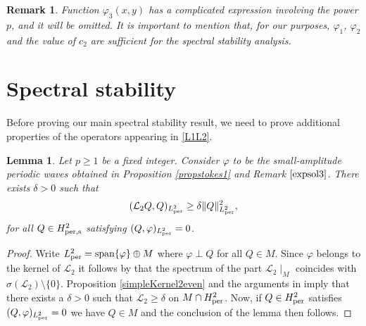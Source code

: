 \documentclass[12pt,reqno,a4paper]{amsart} %
\newcommand{\Ldois}{{\mathcal{L}_2}}
\numberwithin{equation}{section}
\numberwithin{figure}{section}
\newtheorem{remark}[theorem]{Remark}
\newtheorem{lemma}[theorem]{Lemma}
\begin{document}
\begin{remark}
Function $\varphi_3(x,y)$ has a complicated expression involving the power $p$, and it will be omitted. It is important to mention that, for our purposes, $\varphi_1$, $\varphi_2$ and the value of $c_2$ are sufficient for the spectral stability analysis.






\end{remark}





\section{Spectral stability}\label{stasec}





 


Before proving our main spectral stability result, we need to prove additional properties of the operators appearing in \eqref{L1L2}. 

\begin{lemma}\label{bouL2}
	Let $p\geq1$ be a fixed integer. Consider $\varphi$ to be the small-amplitude periodic waves obtained in Proposition \ref{propstokes1} and Remark $\ref{expsol3}$. There exists $\delta>0$ such that
	\begin{equation}\label{a1}
		(\Ldois Q,Q)_{L_{\rm per}^2}\geq\delta\|Q\|_{L_{\rm per}^2}^2,
	\end{equation}
	for all $Q\in H_{\rm per,s}^2$ satisfying $(Q,\varphi)_{L_{\rm per}^2}=0$.
\end{lemma}
\begin{proof}
	Write $L_{\rm per}^2={\rm span}\{\varphi\}\oplus M$ where $\varphi\perp Q$ for all $Q\in M$. Since $\varphi$ belongs to the kernel of
	$\Ldois$ it follows by \cite[Theorem 6.17]{kato} that the spectrum of the
	part $\Ldois{\mid}_M$ coincides with $\sigma(\Ldois)\setminus\{0\}$.
	Proposition \ref{simpleKernel2even} and the arguments in \cite[page 278]{kato} imply
	that there exists a $\delta>0$ such that $\Ldois\geq\delta$ on $M\cap
	H_{\rm per}^2$. Now, if $Q\in H_{\rm per}^2$ satisfies $(Q,\varphi)_{L_{\rm per}^2}=0$ we have $Q\in M$ and
	the conclusion of the lemma then follows.
\end{proof}
\end{document}
